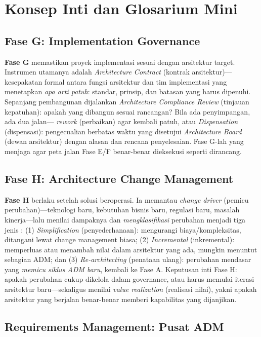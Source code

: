\section{Konsep Inti dan Glosarium Mini}

\subsection{Fase G: Implementation Governance}

\textbf{Fase G} memastikan proyek implementasi sesuai dengan arsitektur target.
Instrumen utamanya adalah \emph{Architecture Contract} (kontrak arsitektur)---
kesepakatan formal antara fungsi arsitektur dan tim implementasi yang menetapkan
\emph{apa arti patuh}: standar, prinsip, dan batasan yang harus dipenuhi. Sepanjang
pembangunan dijalankan \emph{Architecture Compliance Review} (tinjauan kepatuhan):
apakah yang dibangun sesuai rancangan? Bila ada penyimpangan, ada dua jalan---
\emph{rework} (perbaikan) agar kembali patuh, atau \emph{Dispensation} (dispensasi):
pengecualian berbatas waktu yang disetujui \emph{Architecture Board} (dewan
arsitektur) dengan alasan dan rencana penyelesaian. Fase G-lah yang menjaga agar
peta jalan Fase E/F benar-benar dieksekusi seperti dirancang.

\subsection{Fase H: Architecture Change Management}

\textbf{Fase H} berlaku setelah solusi beroperasi. Ia memantau \emph{change driver}
(pemicu perubahan)---teknologi baru, kebutuhan bisnis baru, regulasi baru, masalah
kinerja---lalu menilai dampaknya dan \emph{mengklasifikasi} perubahan menjadi tiga
jenis \cite{togaf10}: (1) \emph{Simplification} (penyederhanaan): mengurangi
biaya/kompleksitas, ditangani lewat change management biasa; (2) \emph{Incremental}
(inkremental): memperluas atau menambah nilai dalam arsitektur yang ada, mungkin
menuntut sebagian ADM; dan (3) \emph{Re-architecting} (penataan ulang): perubahan
mendasar yang \emph{memicu siklus ADM baru}, kembali ke Fase A. Keputusan inti
Fase H: apakah perubahan cukup dikelola dalam governance, atau harus memulai
iterasi arsitektur baru---sekaligus menilai \emph{value realization} (realisasi
nilai), yakni apakah arsitektur yang berjalan benar-benar memberi kapabilitas yang
dijanjikan.

\subsection{Requirements Management: Pusat ADM}

